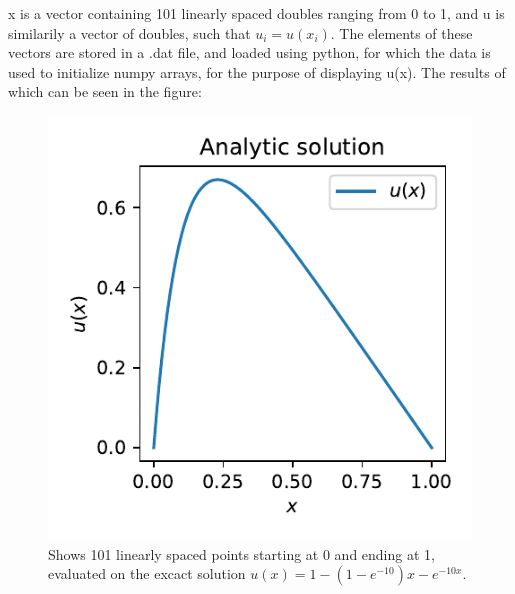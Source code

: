 \documentclass{article}
\begin{document}
x is a vector containing 101 linearly spaced doubles ranging from 0 to 1, and u is similarily a vector of doubles, such that $u_i=u(x_i)$. The elements of these vectors are stored in a .dat file,
and loaded using python, for which the data is used to initialize numpy arrays, for the purpose of displaying u(x). The results of which can be seen in the figure:
\begin{figure}[h]
    \includegraphics{problem_2_fig.pdf}
    \caption{Shows 101 linearly spaced points starting at 0 and ending at 1, evaluated on the excact solution $u(x)=1 - (1 - e^{-10})x - e^{-10x}$.}
\end{figure}
\end{document}
